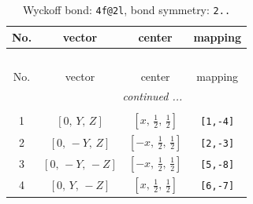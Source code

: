 \documentclass[fleqn,8pt]{jsarticle}
\begin{document}
\renewcommand{\arraystretch}{1.2}
\begin{longtable}{cccc}
\caption{Wyckoff bond: {\tt 4f@2l}, bond symmetry: {\tt 2..}}
 \\
 \hline \hline
No. & vector & center & mapping \\ \hline \endfirsthead

\multicolumn{3}{l}{\tablename\ \thetable{}} \\
 \hline \hline
No. & vector & center & mapping \\ \hline \endhead

 \hline \hline
\multicolumn{3}{r}{\footnotesize\it continued ...} \\ \endfoot

 \hline \hline
\multicolumn{3}{r}{} \\ \endlastfoot

1 & $\left[ 0,\, Y,\, Z \right]$ & $\left[ x,\, \frac{1}{2},\, \frac{1}{2} \right]$ & {\tt [1,-4]} \\ \hline
2 & $\left[ 0,\, - Y,\, Z \right]$ & $\left[ - x,\, \frac{1}{2},\, \frac{1}{2} \right]$ & {\tt [2,-3]} \\ \hline
3 & $\left[ 0,\, - Y,\, - Z \right]$ & $\left[ - x,\, \frac{1}{2},\, \frac{1}{2} \right]$ & {\tt [5,-8]} \\ \hline
4 & $\left[ 0,\, Y,\, - Z \right]$ & $\left[ x,\, \frac{1}{2},\, \frac{1}{2} \right]$ & {\tt [6,-7]} \\
\end{longtable}
\renewcommand{\arraystretch}{1.2}
\end{document}
